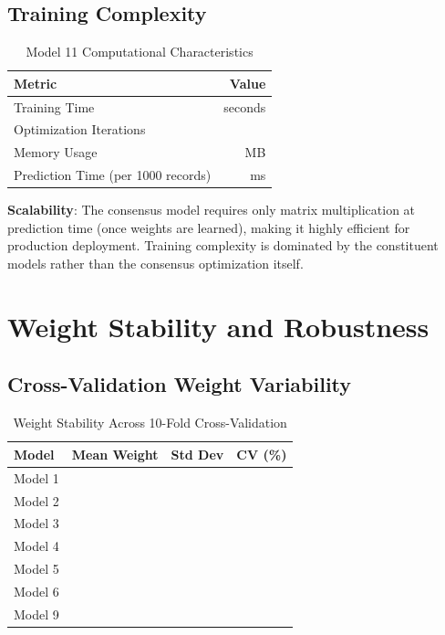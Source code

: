 \subsection{Training Complexity}

\begin{table}[h]
\centering
\caption{Model 11 Computational Characteristics}
\label{tab:model11_computation}
\begin{tabular}{lr}
\toprule
\textbf{Metric} & \textbf{Value} \\
\midrule
Training Time & \ModelElevenTrainingTime{} seconds \\
Optimization Iterations & \ModelElevenOptimizationIters{} \\
Memory Usage & \ModelElevenMemoryUsage{} MB \\
Prediction Time (per 1000 records) & \ModelElevenPredictionTime{} ms \\
\bottomrule
\end{tabular}
\end{table}

\textbf{Scalability}: The consensus model requires only matrix multiplication at prediction time (once weights are learned), making it highly efficient for production deployment. Training complexity is dominated by the constituent models rather than the consensus optimization itself.

\section{Weight Stability and Robustness}

\subsection{Cross-Validation Weight Variability}

\begin{table}[h]
\centering
\caption{Weight Stability Across 10-Fold Cross-Validation}
\label{tab:model11_weight_stability}
\begin{tabular}{lccc}
\toprule
\textbf{Model} & \textbf{Mean Weight} & \textbf{Std Dev} & \textbf{CV (\%)} \\
\midrule
Model 1 & \ModelElevenWeightOne{} & \ModelElevenWeightStdOne{} & \ModelElevenWeightCVOne{} \\
Model 2 & \ModelElevenWeightTwo{} & \ModelElevenWeightStdTwo{} & \ModelElevenWeightCVTwo{} \\
Model 3 & \ModelElevenWeightThree{} & \ModelElevenWeightStdThree{} & \ModelElevenWeightCVThree{} \\
Model 4 & \ModelElevenWeightFour{} & \ModelElevenWeightStdFour{} & \ModelElevenWeightCVFour{} \\
Model 5 & \ModelElevenWeightFive{} & \ModelElevenWeightStdFive{} & \ModelElevenWeightCVFive{} \\
Model 6 & \ModelElevenWeightSix{} & \ModelElevenWeightStdSix{} & \ModelElevenWeightCVSix{} \\
Model 9 & \ModelElevenWeightNine{} & \ModelElevenWeightStdNine{} & \ModelElevenWeightCVNine{} \\
\bottomrule
\end{tabular}
\end{table}

